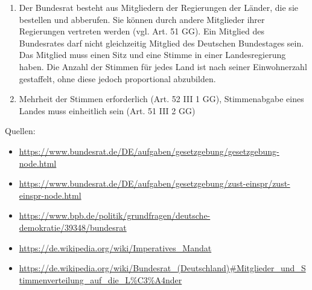 \documentclass{article}
\begin{document}
\begin{enumerate}[label=(\alph*)]
		\item Der Bundesrat besteht aus Mitgliedern der Regierungen der Länder, die sie bestellen und abberufen. Sie können durch andere Mitglieder ihrer Regierungen vertreten werden (vgl. Art. 51 GG). Ein Mitglied des Bundesrates darf nicht gleichzeitig Mitglied des Deutschen Bundestages sein. Das Mitglied muss einen Sitz und eine Stimme in einer Landesregierung haben. Die Anzahl der Stimmen für jedes Land ist nach seiner Einwohnerzahl gestaffelt, ohne diese jedoch proportional abzubilden.
		\item Mehrheit der Stimmen erforderlich (Art. 52 III 1 GG), Stimmenabgabe eines Landes muss einheitlich sein (Art. 51 III 2 GG)
	\end{enumerate}

	Quellen: 
	\begin{itemize}
		\item \url{https://www.bundesrat.de/DE/aufgaben/gesetzgebung/gesetzgebung-node.html}
		\item \url{https://www.bundesrat.de/DE/aufgaben/gesetzgebung/zust-einspr/zust-einspr-node.html}
		\item \url{https://www.bpb.de/politik/grundfragen/deutsche-demokratie/39348/bundesrat}
		\item \url{https://de.wikipedia.org/wiki/Imperatives_Mandat}
		\item \url{https://de.wikipedia.org/wiki/Bundesrat_(Deutschland)#Mitglieder_und_Stimmenverteilung_auf_die_L%C3%A4nder}
	\end{itemize}
	
\end{document}
